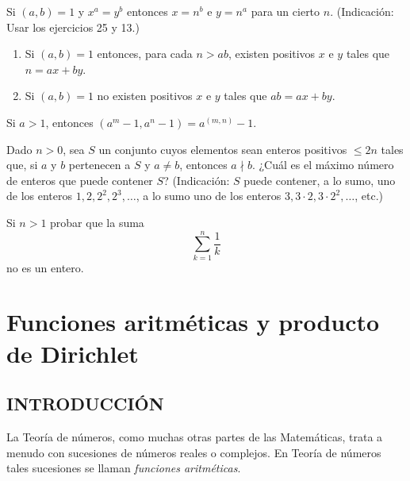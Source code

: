 \documentclass[12pt,a4paper]{book}
\begin{document}
    \begin{ejercicio}
        Si $(a,b)=1$ y $x^a=y^b$ entonces $x=n^b$ e $y=n^a$ para un cierto $n$.
        (Indicación: Usar los ejercicios 25 y 13.)
    \end{ejercicio}

    \begin{ejercicio}
        \begin{enumerate}
            \item[(a)] Si $(a,b)=1$ entonces, para cada $n>ab$, existen positivos $x$ e $y$
            tales que $n=ax+by$.
            \item[(b)] Si $(a,b)=1$ no existen positivos $x$ e $y$ tales que $ab=ax+by$.
        \end{enumerate}
    \end{ejercicio}

    \begin{ejercicio}
        Si $a>1$, entonces $(a^m-1,a^n-1)=a^{(m,n)}-1$.
    \end{ejercicio}

    \begin{ejercicio}
        Dado $n>0$, sea $S$ un conjunto cuyos elementos sean enteros positivos $\leq2n$
        tales que, si $a$ y $b$ pertenecen a $S$ y $a\neq b$, entonces $a\nmid b$. ¿Cuál es
        el máximo número de enteros que puede contener $S$? (Indicación: $S$ puede contener,
        a lo sumo, uno de los enteros $1,2,2^2,2^3,\dots$, a lo sumo uno de los enteros
        $3,3\cdot2,3\cdot2^2,\dots$, etc.)
    \end{ejercicio}

    \begin{ejercicio}
        Si $n>1$ probar que la suma
        \begin{equation*}
            \sum_{k=1}^{n}\frac{1}{k}
        \end{equation*}
        no es un entero.
    \end{ejercicio}

\chapter{Funciones aritméticas y producto de Dirichlet}

    \section{INTRODUCCIÓN}

    La Teoría de números, como muchas otras partes de las Matemáticas, trata a menudo con
    sucesiones de números reales o complejos. En Teoría de números tales sucesiones se
    llaman \textit{funciones aritméticas}.
\end{document}
